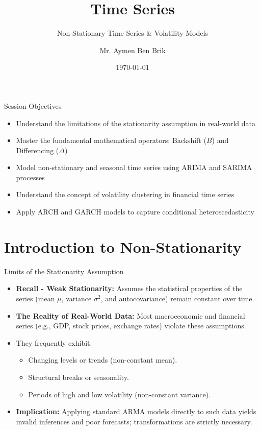 \documentclass[aspectratio=169]{beamer}
\title{Time Series}
\subtitle{Non-Stationary Time Series \& Volatility Models}
\author{Mr. Aymen Ben Brik}
\institute{
Time Series Course 1GAMMA
}
\date{\today}
\begin{document}
\begin{frame}
\titlepage
\end{frame}

\begin{frame}
\tableofcontents
\end{frame}

\begin{frame}{Session Objectives}
\begin{itemize}
    \item Understand the limitations of the stationarity assumption in real-world data
    \item Master the fundamental mathematical operators: Backshift ($B$) and Differencing ($\Delta$)
    \item Model non-stationary and seasonal time series using ARIMA and SARIMA processes
    \item Understand the concept of volatility clustering in financial time series
    \item Apply ARCH and GARCH models to capture conditional heteroscedasticity
\end{itemize}
\end{frame}

\section{Introduction to Non-Stationarity}

\begin{frame}{Limits of the Stationarity Assumption}
\begin{itemize}
    \item \textbf{Recall - Weak Stationarity:} Assumes the statistical properties of the series (mean $\mu$, variance $\sigma^2$, and autocovariance) remain constant over time.
    \vspace{0.2cm}
    \item \textbf{The Reality of Real-World Data:} Most macroeconomic and financial series (e.g., GDP, stock prices, exchange rates) violate these assumptions.
    \vspace{0.2cm}
    \item They frequently exhibit:
    \begin{itemize}
        \item Changing levels or trends (non-constant mean).
        \item Structural breaks or seasonality.
        \item Periods of high and low volatility (non-constant variance).
    \end{itemize}
    \vspace{0.2cm}
    \item \textbf{Implication:} Applying standard ARMA models directly to such data yields invalid inferences and poor forecasts; transformations are strictly necessary.
\end{itemize}
\end{frame}
\end{document}
